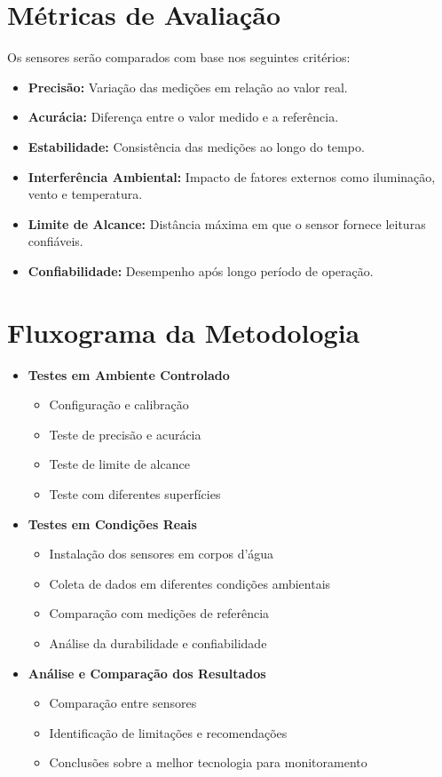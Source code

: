 \section{Métricas de Avaliação}
Os sensores serão comparados com base nos seguintes critérios:
\begin{itemize}
    \item \textbf{Precisão:} Variação das medições em relação ao valor real.
    \item \textbf{Acurácia:} Diferença entre o valor medido e a referência.
    \item \textbf{Estabilidade:} Consistência das medições ao longo do tempo.
    \item \textbf{Interferência Ambiental:} Impacto de fatores externos como iluminação, vento e temperatura.
    \item \textbf{Limite de Alcance:} Distância máxima em que o sensor fornece leituras confiáveis.
    \item \textbf{Confiabilidade:} Desempenho após longo período de operação.
\end{itemize}

\section{Fluxograma da Metodologia}

\begin{itemize}
    \item \textbf{Testes em Ambiente Controlado}
    \begin{itemize}
        \item Configuração e calibração
        \item Teste de precisão e acurácia
        \item Teste de limite de alcance
        \item Teste com diferentes superfícies
    \end{itemize}
    \item \textbf{Testes em Condições Reais}
    \begin{itemize}
        \item Instalação dos sensores em corpos d'água
        \item Coleta de dados em diferentes condições ambientais
        \item Comparação com medições de referência
        \item Análise da durabilidade e confiabilidade
    \end{itemize}
    \item \textbf{Análise e Comparação dos Resultados}
    \begin{itemize}
        \item Comparação entre sensores
        \item Identificação de limitações e recomendações
        \item Conclusões sobre a melhor tecnologia para monitoramento
    \end{itemize}
\end{itemize}


